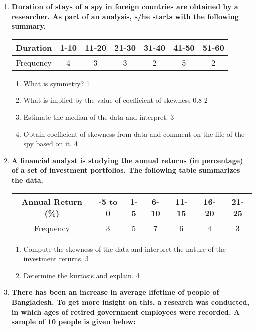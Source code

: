 \documentclass[a4paper,oneside]{book}
\begin{document}
  \begin{enumerate}

   \item
	  \textbf{Duration of stays of a spy in foreign countries are obtained by a researcher. As part of an analysis, s/he starts with the following summary.} 
	  
	  \begin{table}[h]
	  \centering
\begin{tabular}{c|cccccc}
Duration & 1-10 & 11-20 & 21-30 & 31-40 & 41-50 & 51-60 \\ \hline
Frequency & 4 & 3 & 3 & 2 & 5 & 2
\end{tabular}
\end{table}
  
  \begin{enumerate}
    \item
	What is symmetry? \hfill 1
    \item
	What is implied by the value of coefficient of skewness 0.8 \hfill 2
    \item  
	Estimate the median of the data and interpret. \hfill 3
    \item
	Obtain coefficient of skewness from data and comment on the life of the spy based on it. \hfill 4
  \end{enumerate}
  
  
  \item  
  \textbf{A financial analyst is studying the annual returns (in percentage) of a set of investment portfolios. The following table summarizes the data.}  

\begin{table}[h]
\centering
\begin{tabular}{c|cccccc}
Annual Return (\%) & -5 to 0 & 1-5 & 6-10 & 11-15 & 16-20 & 21-25 \\ \hline
Frequency & 3 & 5 & 7 & 6 & 4 & 3
\end{tabular}
\end{table}

  \begin{enumerate}
    \item  
	Compute the skewness of the data and interpret the nature of the investment returns.  \hfill 3  
    \item  
	Determine the kurtosis and explain.  \hfill 4  
  \end{enumerate}  



   \item
	  \textbf{There has been an increase in average lifetime of people of Bangladesh. To get more insight on this, a research was conducted, in which ages of retired government employees were recorded. A sample of 10 people is given below:}
	  

\end{enumerate}
\end{document}
